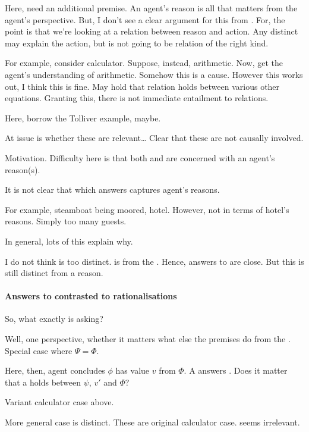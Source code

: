 \begin{note}
  Here, need an additional premise.
  An agent's reason is all that matters from the agent's perspective.
  But, I don't see a clear argument for this from \citeauthor{Davidson:1963aa}.
  For, the point is that we're looking at a relation between reason and action.
  Any distinct \ros{} may explain the action, but is not going to be relation of the right kind.

  For example, consider calculator.
  Suppose, instead, arithmetic.
  Now, get the agent's understanding of arithmetic.
  Somehow this is a cause.
  However this works out, I think this is fine.
  May hold that relation holds between various other equations.
  Granting this, there is not immediate entailment to relations.

  Here, borrow the Tolliver example, maybe.

  At issue is whether these \ros{} are relevant\dots
  Clear that these are not causally involved.
\end{note}

\begin{note}
  Motivation.
  Difficulty here is that both \citeauthor{Davidson:1963aa} and \citeauthor{Hieronymi:2011aa} are concerned with an agent's reason(s).

  It is not clear that \ros{} which answers \qWhy{} captures agent's reasons.

  For example, steamboat being moored, hotel.
  However, not in terms of hotel's reasons.
  Simply too many guests.

  In general, lots of this explain why.

  I do not think \issueInclusion{} is too distinct.
  \ros{} is from the \agpe{}.
  Hence, answers to \qWhy{} are close.
  But this is still distinct from a reason.
\end{note}

\paragraph{Answers to \qWhy{} contrasted to rationalisations}

\begin{note}
  So, what exactly is \qWhy{} asking?

  Well, one perspective, whether it matters what else the premises do from the \agpe{}.
  Special case where \(\Psi = \Phi\).

  Here, then, agent concludes \(\phi\) has value \(v\) from \(\Phi\).
  A \ros{} answers \qWhy{}.
  Does it matter that a \ros{} holds between \(\psi\), \(v'\) and \(\Phi\)?

  Variant calculator case above.

  More general case is distinct.
  These are original calculator case.
  \ros{} seems irrelevant.
\end{note}


